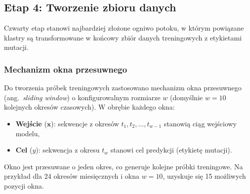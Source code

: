 \subsection{Etap 4: Tworzenie zbioru danych}
\label{subsec:tworzenie-zbioru}

Czwarty etap stanowi najbardziej złożone ogniwo potoku, w którym powiązane klastry są transformowane w końcowy zbiór danych treningowych z etykietami mutacji.

\subsubsection{Mechanizm okna przesuwnego}
\label{subsubsec:okno-przesuwne}

Do tworzenia próbek treningowych zastosowano mechanizm okna przesuwnego (ang.~\emph{sliding window}) o konfigurowalnym rozmiarze $w$ (domyślnie $w = 10$ kolejnych okresów czasowych). W obrębie każdego okna:

\begin{itemize}
    \item \textbf{Wejście} ($\mathbf{x}$): sekwencje z okresów $t_1, t_2, \ldots, t_{w-1}$ stanowią ciąg wejściowy modelu,
    \item \textbf{Cel} ($y$): sekwencja z okresu $t_w$ stanowi cel predykcji (etykietę mutacji).
\end{itemize}

Okno jest przesuwane o jeden okres, co generuje kolejne próbki treningowe. Na przykład dla 24 okresów miesięcznych i okna $w = 10$, uzyskuje się 15 możliwych pozycji okna.

